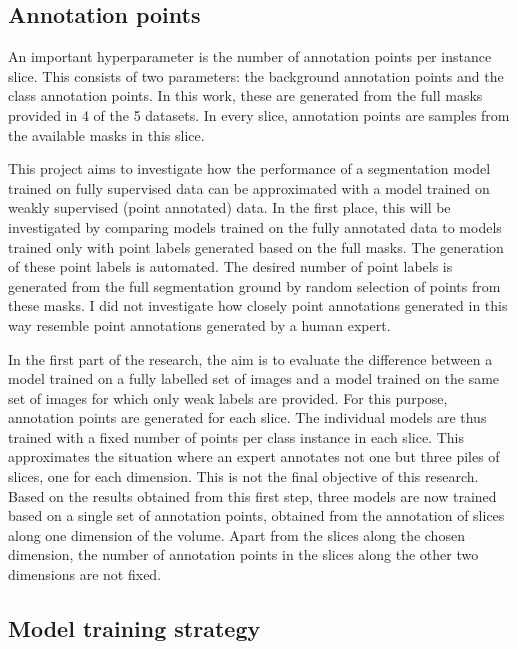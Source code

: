 \subsection{Annotation points}
\par{
    An important hyperparameter is the number of annotation points per instance slice.
    This consists of two parameters: the background annotation points and the class annotation points.
    In this work, these are generated from the full masks provided in 4 of the 5 datasets.
    In every slice, annotation points are samples from the available masks in this slice.
}
\par{
    This project aims to investigate how the performance of a segmentation model trained on fully supervised data can be approximated with a model trained on weakly supervised (point annotated) data.
    In the first place, this will be investigated by comparing models trained on the fully annotated data to models trained only with point labels generated based on the full masks.
    The generation of these point labels is automated. 
    The desired number of point labels is generated from the full segmentation ground by random selection of points from these masks.
    I did not investigate how closely point annotations generated in this way resemble point annotations generated by a human expert.
}
\par{
    In the first part of the research, the aim is to evaluate the difference between a model trained on a fully labelled set of images and a model trained on the same set of images for which only weak labels are provided.
    For this purpose, annotation points are generated for each slice.
    The individual models are thus trained with a fixed number of points per class instance in each slice. 
    This approximates the situation where an expert annotates not one but three piles of slices, one for each dimension. This is not the final objective of this research.
    Based on the results obtained from this first step, three models are now trained based on a single set of annotation points, obtained from the annotation of slices along one dimension of the volume.
    Apart from the slices along the chosen dimension, the number of annotation points in the slices along the other two dimensions are not fixed.
}

\subsection{Model training strategy}

